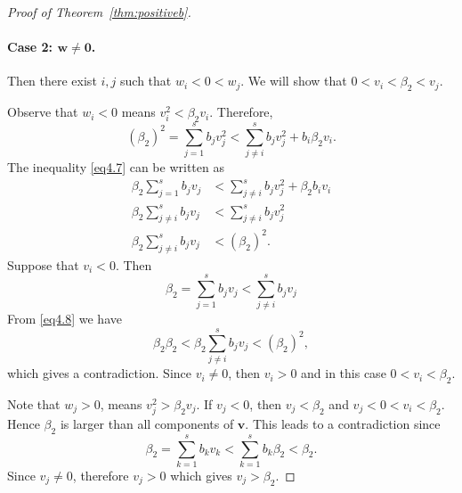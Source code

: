 \begin{proof}[Proof of Theorem~\ref{thm:positiveb}]
\paragraph{Case 2: \( \bm{w} \neq \bm{0} \).}
Then there exist $i,j$ such that $w_i<0<w_j$.
     We will show that \( 0 < v_{i} < \beta_{2} < v_{j} \).

    Observe that $w_i<0$ means \( v_{i}^{2} < \beta_{2}v_{i} \). Therefore,
    \begin{equation}\label{eq4.7}
        (\beta_{2})^{2} = \sum_{j=1}^{s}b_{j}v_{j}^{2} < \sum_{j \neq i}^{s}b_{j}v_{j}^{2} + b_{i}\beta_{2}v_{i}.
    \end{equation}
    The inequality \eqref{eq4.7} can be written as
    \begin{equation}\label{eq4.8}
        \begin{split}
            \beta_{2}\sum_{j=1}^{s}b_{j}v_{j} &< \sum_{j \neq i}^{s}b_{j}v_{j}^{2} + \beta_{2}b_{i}v_{i} \\
            \beta_{2}\sum_{j \neq i}^{s}b_{j}v_{j} &< \sum_{j \neq i}^{s}b_{j}v_{j}^{2} \\
            \beta_{2}\sum_{j \neq i}^{s}b_{j}v_{j} &< (\beta_{2})^{2}.
        \end{split}
    \end{equation}
    Suppose that \( v_{i} < 0 \). Then
    \begin{equation*}
        \beta_{2} = \sum_{j=1}^{s}b_{j}v_{j} < \sum_{j \neq i}^{s}b_{j}v_{j}
    \end{equation*}
    From \eqref{eq4.8} we have
    \begin{equation*}
            \beta_{2}\beta_{2} < \beta_{2}\sum_{j \neq i}^{s}b_{j}v_{j} < (\beta_{2})^{2},
    \end{equation*}
    which gives a contradiction. Since \( v_{i} \neq 0 \), then \( v_{i} > 0 \) and in this case \( 0 < v_{i} < \beta_{2} \).

    Note that \( w_{j} > 0 \), means \( v_{j}^{2} > \beta_{2}v_{j} \). If \( v_{j} < 0 \), then \( v_{j} < \beta_{2} \) and \( v_{j} < 0 < v_{i} < \beta_{2} \). Hence \( \beta_{2} \) is larger than all components of \( \bm{v} \). This leads to a contradiction since
    \begin{equation*}
            \beta_{2} = \sum_{k=1}^{s}b_{k}v_{k} < \sum_{k=1}^{s}b_{k}\beta_{2} < \beta_{2}.
    \end{equation*}
    Since \( v_{j}\ne0 \), therefore \( v_{j} > 0 \) which gives \( v_{j} > \beta_{2} \).


\end{proof}
